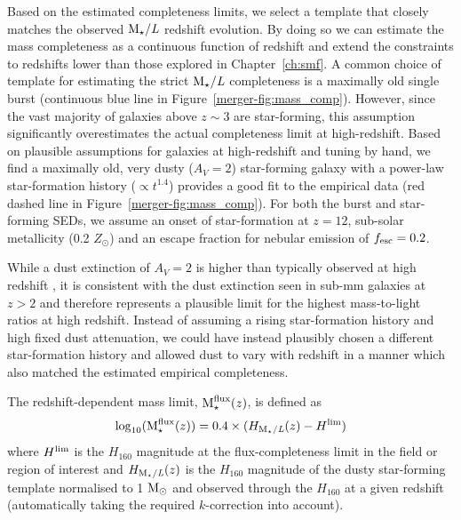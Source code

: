 Based on the estimated completeness limits, we select a \citet{Bruzual:2003ckb} template that closely matches the observed $\text{M}_{\star}/\textit{L}$ redshift evolution. By doing so we can estimate the mass completeness as a continuous function of redshift and extend the constraints to redshifts lower than those explored in Chapter~\ref{ch:smf}. A common choice of template for estimating the strict $\text{M}_{\star}/\textit{L}$ completeness is a maximally old single burst (continuous blue line in Figure~\ref{merger-fig:mass_comp}). However, since the vast majority of galaxies above $z\sim3$ are star-forming, this assumption significantly overestimates the actual completeness limit at high-redshift. Based on plausible assumptions for galaxies at high-redshift and tuning by hand, we find a maximally old, very dusty ($A_{V} = 2$) star-forming galaxy with a power-law star-formation history ($\propto t^{1.4}$) provides a good fit to the empirical data (red dashed line in Figure~\ref{merger-fig:mass_comp}). For both the burst and star-forming SEDs, we assume an onset of star-formation at $z = 12$, sub-solar metallicity (0.2 $Z_{\odot}$) and an escape fraction for nebular emission of $f_{\rm{esc}} = 0.2$. 

While a dust extinction of $A_{V} = 2$ is higher than typically observed at high redshift \citep{2015A&A...574A..19S}, it is consistent with the dust extinction seen in sub-mm galaxies at $z > 2$ \citep{Targett:2013kg,Wiklind:2014gs,Smolcic:2015ke} and therefore represents a plausible limit for the highest mass-to-light ratios at high redshift. Instead of assuming a rising star-formation history and high fixed dust attenuation, we could have instead plausibly chosen a different star-formation history and allowed dust to vary with redshift in a manner which also matched the estimated empirical completeness.

The redshift-dependent mass limit, $\text{M}_{\star}^{\rm{flux}}(z)$, is defined as
\begin{equation}\label{eq:fluxlim}
	\log_{10}(\text{M}_{\star}^{\rm{flux}}(z)) = 	0.4\times( H_{\text{M}_{\star}/\textit{L}}(z) - H^{\rm{lim}})
\end{equation}
where $H^{\rm{lim}}$ is the $H_{160}$ magnitude at the flux-completeness limit in the field or region of interest and $H_{\text{M}_{\star}/\textit{L}}(z)$ is the $H_{160}$ magnitude of the dusty star-forming template normalised to 1 $\rm{M}_{\odot}$ and observed through the $H_{160}$ at a given redshift (automatically taking the required $k$-correction into account).


